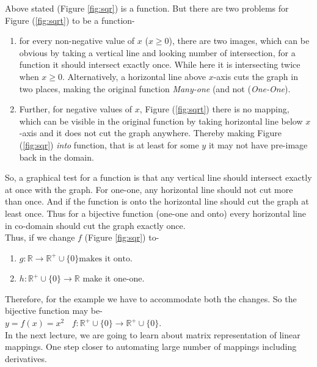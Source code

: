 \documentclass{article}
\begin{document}
Above stated (Figure \ref{fig:sqr}) is a function. But there are two problems for Figure (\ref{fig:sqrt}) to be a function-
\begin{enumerate}
    \item for every non-negative value of $x$ ($x\geq 0$), there are two images, which can be obvious by taking a vertical line and looking number of intersection, for a function it should intersect exactly once. While here it is intersecting twice when $x\geq 0$. Alternatively, a horizontal line above $x$-axis cuts the graph in two places, making the original function \textit{Many-one} (and not (\textit{One-One}).
    
    \item Further, for negative values of $x$, Figure (\ref{fig:sqrt}) there is no mapping, which can be visible in the original function by taking horizontal line below $x$-axis and it does not cut the graph anywhere. Thereby making Figure (\ref{fig:sqr}) \textit{into} function, that is at least for some $y$ it may not have pre-image back in the  domain. 
\end{enumerate}
So, a graphical test for a function is that any vertical line should intersect exactly at once with the graph. For one-one, any horizontal line should not cut more than once. And if the function is onto the horizontal line should cut the graph at least once. Thus for a bijective function (one-one and onto) every horizontal line in co-domain should cut the graph exactly once.\\

Thus, if we change $f$ (Figure \ref{fig:sqr}) to-
\begin{enumerate}
    \item \(g\colon\mathbb{R}\longrightarrow\mathbb{R}^+\cup\{0\} \text{makes it onto.}\) 
    \item $h\colon \mathbb{R}^+ \cup \{0\} \longrightarrow\mathbb{R}$ make it one-one. 
\end{enumerate}

Therefore, for the example we have to accommodate both the changes. So the bijective function may be-\\
$y = f(x) = x^2~~~~f\colon\mathbb{R}^+\cup\{0\}\longrightarrow\mathbb{R}^+\cup\{0\}$.\\

In the next lecture, we are going to learn about matrix representation of linear mappings. One step closer to automating large number of mappings including derivatives.
\end{document}
